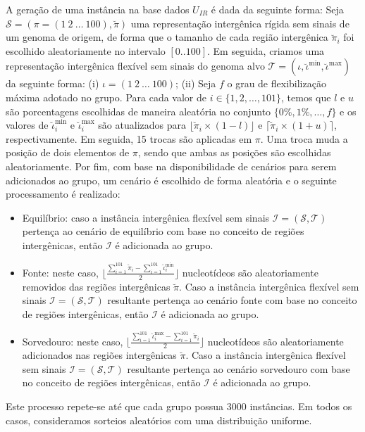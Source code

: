 A geração de uma instância na base dados $U_{IR}$ é dada da seguinte forma: Seja $\mathcal{S} = (\pi =(1~2~\dots~100),\breve\pi)$ uma representação intergênica rígida sem sinais de um genoma de origem, de forma que o tamanho de cada região intergênica $\breve\pi_i$ foi escolhido aleatoriamente no intervalo $[0..100]$. Em seguida, criamos uma representação intergênica flexível sem sinais do genoma alvo $\mathcal{T} = (\iota, \breve\iota^{\min},\breve\iota^{\max})$ da seguinte forma: (i) $\iota =(1~2~\dots~100)$; (ii) Seja $f$ o grau de flexibilização máxima adotado no grupo. Para cada valor de $i \in \{1,2,\dots,101\}$, temos que $l$ e $u$ são porcentagens escolhidas de maneira aleatória no conjunto $\{0\%,1\%,\dots,f\}$ e os valores de $\breve\iota^{\min}_i$ e $\breve\iota^{\max}_i$ são atualizados para $\lfloor\breve\pi_i \times (1 - l)\rfloor$ e $\lceil\breve\pi_i \times (1 + u)\rceil$, respectivamente. Em seguida, 15 trocas são aplicadas em $\pi$. Uma troca muda a posição de dois elementos de $\pi$, sendo que ambas as posições são escolhidas aleatoriamente. Por fim, com base na disponibilidade de cenários para serem adicionados ao grupo, um cenário é escolhido de forma aleatória e o seguinte processamento é realizado:
\begin{itemize}
  \item Equilíbrio: caso a instância intergênica flexível sem sinais $\mathcal{I} = (\mathcal{S},\mathcal{T})$ pertença ao cenário de equilíbrio com base no conceito de regiões intergênicas, então $\mathcal{I}$ é adicionada ao grupo.
  \item Fonte: neste caso, $\lfloor\frac{\sum_{i = 1}^{101}\breve\pi_i - \sum_{i = 1}^{101}\breve\iota^{\min}_i}{2}\rfloor$ nucleotídeos são aleatoriamente removidos das regiões intergênicas $\breve\pi$. Caso a instância intergênica flexível sem sinais $\mathcal{I} = (\mathcal{S},\mathcal{T})$ resultante pertença ao cenário fonte com base no conceito de regiões intergênicas, então $\mathcal{I}$ é adicionada ao grupo.
  \item Sorvedouro: neste caso, $\lfloor\frac{\sum_{i = 1}^{101}\breve\iota^{\max}_i - \sum_{i = 1}^{101}\breve\pi_i}{2}\rfloor$ nucleotídeos são aleatoriamente adicionados nas regiões intergênicas $\breve\pi$. Caso a instância intergênica flexível sem sinais $\mathcal{I} = (\mathcal{S},\mathcal{T})$ resultante pertença ao cenário sorvedouro com base no conceito de regiões intergênicas, então $\mathcal{I}$ é adicionada ao grupo.
\end{itemize}
Este processo repete-se até que cada grupo possua 3000 instâncias. Em todos os casos, consideramos sorteios aleatórios com uma distribuição uniforme.


